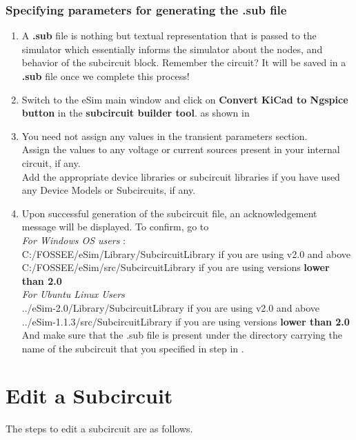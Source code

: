 \begin{itemize}
\subsubsection{Specifying parameters for generating the \textbf{.sub} file }
\begin{enumerate}
\item A \textbf{.sub} file is nothing but textual representation that is passed to the simulator which essentially informs the simulator about the nodes, and behavior of the subcircuit block.
Remember the  circuit? It will be saved in a \textbf{.sub} file once we complete this process!
 \item Switch to the eSim main window and click on \textbf{Convert KiCad to Ngspice button} in the \textbf{subcircuit builder tool}. as shown in 
 \item You need not assign any values in the transient parameters section. \\
 Assign the values to any voltage or current sources present in your internal circuit, if any. \\
 Add the appropriate device libraries or subcircuit libraries if you have used any Device Models or  Subcircuits, if any. 
 \item Upon successful generation of the subcircuit file, an acknowledgement message will be displayed. To confirm, go to \\
 \large \textit{For Windows OS users} : \\
 \large {C:/FOSSEE/eSim/Library/SubcircuitLibrary if you are using v2.0 and above} \\
 \large C:/FOSSEE/eSim/src/SubcircuitLibrary if you are using versions \textbf{lower than 2.0} \\
 
 \large \textit{For Ubuntu Linux Users} \\
 ../eSim-2.0/Library/SubcircuitLibrary if you are using v2.0 and above \\
 ../eSim-1.1.3/src/SubcircuitLibrary if you are using versions \textbf{lower than 2.0} \\
 And make sure that the .sub file is present under the directory carrying the name of the subcircuit that you specified in step in .
 
 \end{enumerate}

\end{itemize}

\section{Edit a Subcircuit}
The steps to edit a subcircuit are as follows.

